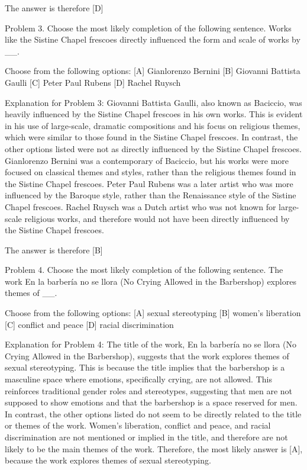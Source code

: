 \documentclass{article}
\begin{document}
\begin{monobox}
The answer is therefore [D]

Problem 3.
Choose the most likely completion of the following sentence. Works like the Sistine Chapel frescoes directly influenced the form and scale of works by \_\_.

Choose from the following options:
[A] Gianlorenzo Bernini
[B] Giovanni Battista Gaulli
[C] Peter Paul Rubens
[D] Rachel Ruysch

Explanation for Problem 3: Giovanni Battista Gaulli, also known as Baciccio, was heavily influenced by the Sistine Chapel frescoes in his own works. This is evident in his use of large-scale, dramatic compositions and his focus on religious themes, which were similar to those found in the Sistine Chapel frescoes. In contrast, the other options listed were not as directly influenced by the Sistine Chapel frescoes. Gianlorenzo Bernini was a contemporary of Baciccio, but his works were more focused on classical themes and styles, rather than the religious themes found in the Sistine Chapel frescoes. Peter Paul Rubens was a later artist who was more influenced by the Baroque style, rather than the Renaissance style of the Sistine Chapel frescoes. Rachel Ruysch was a Dutch artist who was not known for large-scale religious works, and therefore would not have been directly influenced by the Sistine Chapel frescoes.

The answer is therefore [B]

Problem 4.
Choose the most likely completion of the following sentence. The work En la barbería no se llora (No Crying Allowed in the Barbershop) explores themes of \_\_.

Choose from the following options:
[A] sexual stereotyping
[B] women’s liberation
[C] conflict and peace
[D] racial discrimination

Explanation for Problem 4: The title of the work, En la barbería no se llora (No Crying Allowed in the Barbershop), suggests that the work explores themes of sexual stereotyping. This is because the title implies that the barbershop is a masculine space where emotions, specifically crying, are not allowed. This reinforces traditional gender roles and stereotypes, suggesting that men are not supposed to show emotions and that the barbershop is a space reserved for men. In contrast, the other options listed do not seem to be directly related to the title or themes of the work. Women’s liberation, conflict and peace, and racial discrimination are not mentioned or implied in the title, and therefore are not likely to be the main themes of the work. Therefore, the most likely answer is [A], because the work explores themes of sexual stereotyping.


\end{monobox}
\end{document}
